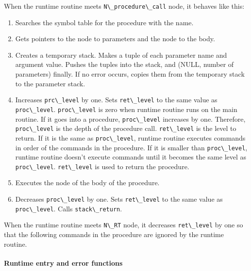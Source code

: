 When the runtime routine meets
\passthrough{\lstinline!N\_procedure\_call!} node, it behaves like this:

\begin{enumerate}
\def\labelenumi{\arabic{enumi}.}
\tightlist
\item
  Searches the symbol table for the procedure with the name.
\item
  Gets pointers to the node to parameters and the node to the body.
\item
  Creates a temporary stack. Makes a tuple of each parameter name and
  argument value. Pushes the tuples into the stack, and (NULL, number of
  parameters) finally. If no error occurs, copies them from the
  temporary stack to the parameter stack.
\item
  Increases \passthrough{\lstinline!prc\_level!} by one. Sets
  \passthrough{\lstinline!ret\_level!} to the same value as
  \passthrough{\lstinline!proc\_level!}.
  \passthrough{\lstinline!proc\_level!} is zero when runtime routine
  runs on the main routine. If it goes into a procedure,
  \passthrough{\lstinline!proc\_level!} increases by one. Therefore,
  \passthrough{\lstinline!proc\_level!} is the depth of the procedure
  call. \passthrough{\lstinline!ret\_level!} is the level to return. If
  it is the same as \passthrough{\lstinline!proc\_level!}, runtime
  routine executes commands in order of the commands in the procedure.
  If it is smaller than \passthrough{\lstinline!proc\_level!}, runtime
  routine doesn't execute commands until it becomes the same level as
  \passthrough{\lstinline!proc\_level!}.
  \passthrough{\lstinline!ret\_level!} is used to return the procedure.
\item
  Executes the node of the body of the procedure.
\item
  Decreases \passthrough{\lstinline!proc\_level!} by one. Sets
  \passthrough{\lstinline!ret\_level!} to the same value as
  \passthrough{\lstinline!proc\_level!}. Calls
  \passthrough{\lstinline!stack\_return!}.
\end{enumerate}

When the runtime routine meets \passthrough{\lstinline!N\_RT!} node, it
decreases \passthrough{\lstinline!ret\_level!} by one so that the
following commands in the procedure are ignored by the runtime routine.

\hypertarget{runtime-entry-and-error-functions}{%
\paragraph{Runtime entry and error
functions}\label{runtime-entry-and-error-functions}}

